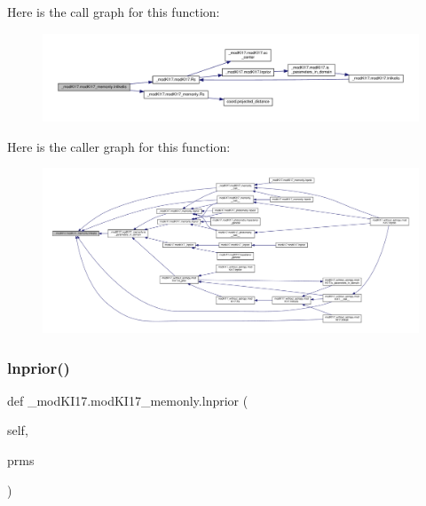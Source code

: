 Here is the call graph for this function\+:\nopagebreak
\begin{figure}[H]
\begin{center}
\leavevmode
\includegraphics[width=350pt]{d9/d8f/class__modKI17_1_1modKI17__memonly_a15f3ae6794705cadd3f9a57b954c1fc2_cgraph}
\end{center}
\end{figure}
Here is the caller graph for this function\+:\nopagebreak
\begin{figure}[H]
\begin{center}
\leavevmode
\includegraphics[width=350pt]{d9/d8f/class__modKI17_1_1modKI17__memonly_a15f3ae6794705cadd3f9a57b954c1fc2_icgraph}
\end{center}
\end{figure}
\mbox{\label{class__modKI17_1_1modKI17__memonly_a81432d4c6b99b0325dec864f96d55129}} 
\subsubsection{\texorpdfstring{lnprior()}{lnprior()}}
{\footnotesize\ttfamily def \+\_\+mod\+K\+I17.\+mod\+K\+I17\+\_\+memonly.\+lnprior (\begin{DoxyParamCaption}\item[{}]{self,  }\item[{}]{prms }\end{DoxyParamCaption})}



